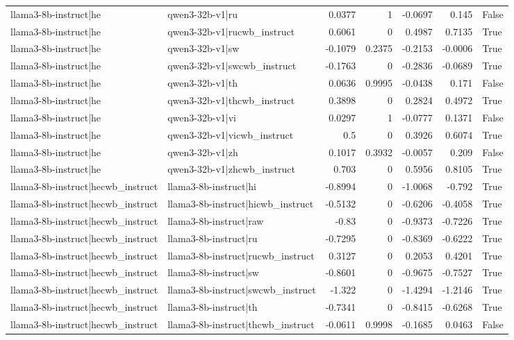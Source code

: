 \begin{table}
\begin{tabular}{l l r r r r l}
llama3-8b-instruct|he & qwen3-32b-v1|ru & 0.0377 & 1 & -0.0697 & 0.145 & False \\
llama3-8b-instruct|he & qwen3-32b-v1|rucwb_instruct & 0.6061 & 0 & 0.4987 & 0.7135 & True \\
llama3-8b-instruct|he & qwen3-32b-v1|sw & -0.1079 & 0.2375 & -0.2153 & -0.0006 & True \\
llama3-8b-instruct|he & qwen3-32b-v1|swcwb_instruct & -0.1763 & 0 & -0.2836 & -0.0689 & True \\
llama3-8b-instruct|he & qwen3-32b-v1|th & 0.0636 & 0.9995 & -0.0438 & 0.171 & False \\
llama3-8b-instruct|he & qwen3-32b-v1|thcwb_instruct & 0.3898 & 0 & 0.2824 & 0.4972 & True \\
llama3-8b-instruct|he & qwen3-32b-v1|vi & 0.0297 & 1 & -0.0777 & 0.1371 & False \\
llama3-8b-instruct|he & qwen3-32b-v1|vicwb_instruct & 0.5 & 0 & 0.3926 & 0.6074 & True \\
llama3-8b-instruct|he & qwen3-32b-v1|zh & 0.1017 & 0.3932 & -0.0057 & 0.209 & False \\
llama3-8b-instruct|he & qwen3-32b-v1|zhcwb_instruct & 0.703 & 0 & 0.5956 & 0.8105 & True \\
llama3-8b-instruct|hecwb_instruct & llama3-8b-instruct|hi & -0.8994 & 0 & -1.0068 & -0.792 & True \\
llama3-8b-instruct|hecwb_instruct & llama3-8b-instruct|hicwb_instruct & -0.5132 & 0 & -0.6206 & -0.4058 & True \\
llama3-8b-instruct|hecwb_instruct & llama3-8b-instruct|raw & -0.83 & 0 & -0.9373 & -0.7226 & True \\
llama3-8b-instruct|hecwb_instruct & llama3-8b-instruct|ru & -0.7295 & 0 & -0.8369 & -0.6222 & True \\
llama3-8b-instruct|hecwb_instruct & llama3-8b-instruct|rucwb_instruct & 0.3127 & 0 & 0.2053 & 0.4201 & True \\
llama3-8b-instruct|hecwb_instruct & llama3-8b-instruct|sw & -0.8601 & 0 & -0.9675 & -0.7527 & True \\
llama3-8b-instruct|hecwb_instruct & llama3-8b-instruct|swcwb_instruct & -1.322 & 0 & -1.4294 & -1.2146 & True \\
llama3-8b-instruct|hecwb_instruct & llama3-8b-instruct|th & -0.7341 & 0 & -0.8415 & -0.6268 & True \\
llama3-8b-instruct|hecwb_instruct & llama3-8b-instruct|thcwb_instruct & -0.0611 & 0.9998 & -0.1685 & 0.0463 & False \\

\end{tabular}
\end{table}
